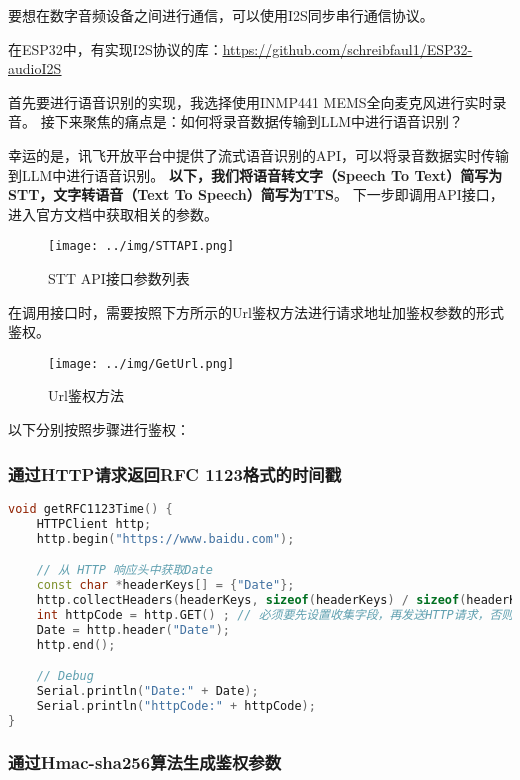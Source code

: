要想在数字音频设备之间进行通信，可以使用I2S同步串行通信协议。

在ESP32中，有实现I2S协议的库：\href{https://github.com/schreibfaul1/ESP32-audioI2S}{\underline{https://github.com/schreibfaul1/ESP32-audioI2S}}

首先要进行语音识别的实现，我选择使用INMP441 MEMS全向麦克风进行实时录音。
接下来聚焦的痛点是：如何将录音数据传输到LLM中进行语音识别？

幸运的是，讯飞开放平台中提供了流式语音识别的API，可以将录音数据实时传输到LLM中进行语音识别。
\textbf{以下，我们将语音转文字（Speech To Text）简写为STT，文字转语音（Text To Speech）简写为TTS}。
下一步即调用API接口，进入官方文档中获取相关的参数。

\begin{figure} [H]
    \centering
    \texttt{[image: ../img/STTAPI.png]}
    \caption{STT API接口参数列表}
    \label{fig:STTAPI}
\end{figure}

在调用接口时，需要按照下方所示的Url鉴权方法进行请求地址加鉴权参数的形式鉴权。

\begin{figure} [H]
    \centering
    \texttt{[image: ../img/GetUrl.png]}
    \caption{Url鉴权方法}
    \label{fig:Url Authorization}
\end{figure}

以下分别按照步骤进行鉴权：

\subsubsection{通过HTTP请求返回RFC 1123格式的时间戳}

\begin{lstlisting}[language = C++, title = {通过HTTP请求返回RFC1123格式的时间戳}]
void getRFC1123Time() {
    HTTPClient http;
    http.begin("https://www.baidu.com");

    // 从 HTTP 响应头中获取Date
    const char *headerKeys[] = {"Date"};
    http.collectHeaders(headerKeys, sizeof(headerKeys) / sizeof(headerKeys[0]));
    int httpCode = http.GET() ; // 必须要先设置收集字段，再发送HTTP请求，否则收集不到
    Date = http.header("Date");
    http.end();

    // Debug
    Serial.println("Date:" + Date);
    Serial.println("httpCode:" + httpCode);
}
\end{lstlisting}

\subsubsection{通过Hmac-sha256算法生成鉴权参数}

